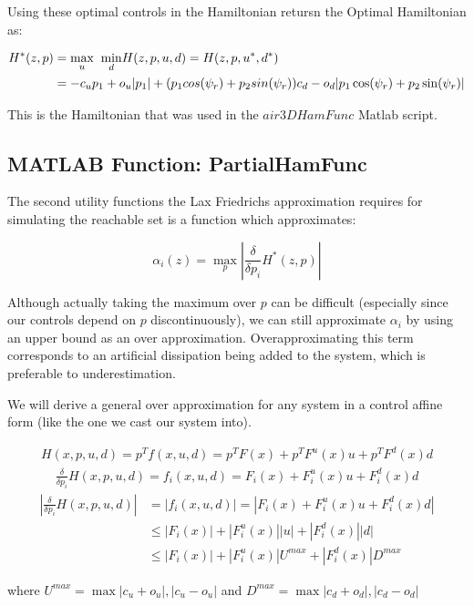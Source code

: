 \documentclass[a4paper]{article}
\begin{document}
Using these optimal controls in the Hamiltonian retursn the Optimal Hamiltonian as:

\begin{align}
  H^*(z,p) &= \underset{u}{\max} \hspace{2 mm} \underset{d}{\min} H(z,p,u,d) = H(z,p,u^*,d^*)
  \\       &= -c_u p_1 + o_u | p_1 |
  + (p_1 cos(\psi_r) + p_2 sin(\psi_r)) c_d - o_d |p_1 \cos(\psi_r) + p_2 \sin(\psi_r)|
\end{align}

This is the Hamiltonian that was used in the $air3DHamFunc$ Matlab script.

\subsection{MATLAB Function: PartialHamFunc}
The second utility functions the Lax Friedrichs approximation requires for simulating the reachable set is a function which approximates:

$$
\alpha_i(z) = \underset{p}{\max} \left| \frac{\delta}{\delta p_i} H^*(z,p) \right|
$$

Although actually taking the maximum over $p$ can be difficult (especially since our controls depend on $p$ discontinuously), we can still approximate $\alpha_i$ by using an upper bound as an over approximation.
Overapproximating this term corresponds to an artificial dissipation being added to the system, which is preferable to underestimation.

We will derive a general over approximation for any system in a control affine form (like the one we cast our system into).

\begin{align*}
  H(x,p,u,d) = p^T f(x,u,d) = p^T F(x) + p^T F^u(x) u + p^T F^d(x) d
\end{align*}
\begin{align*}
  \frac{\delta}{\delta p_i} H(x,p,u,d) = f_i(x,u,d) = F_i(x) + F^u_i(x) u + F^d_i(x) d
\end{align*}
\begin{align*}
  \left|\frac{\delta}{\delta p_i} H(x,p,u,d)\right| &= |f_i(x,u,d)| = |F_i(x) + F^u_i(x) u + F^d_i(x) d|
   \\ &\leq |F_i(x)| + |F^u_i(x)| |u| + |F^d_i(x)| |d|
   \\ &\leq |F_i(x)| + |F^u_i(x)| U^{max} + |F^d_i(x)| D^{max}
\end{align*}

where $U^{max}  = \max{|c_u+o_u| , |c_u-o_u|}$ and $D^{max}  = \max{|c_d+o_d| , |c_d-o_d|}$
\end{document}

